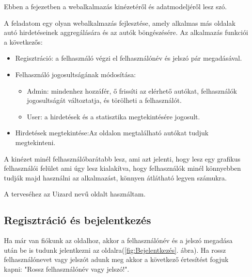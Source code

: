 Ebben a fejezetben a webalkalmazás kinézetéről és adatmodeljéről lesz szó.



A feladatom egy olyan webalkalmazás fejlesztése, amely alkalmas más oldalak autó hirdetéseinek aggregálására és az autók böngészésére. Az alkalmazás funkciói a következős:

\begin{itemize}
\item Regisztráció: a felhasználó végzi el felhasználónév és jelszó pár megadásával.
\item Felhasználó jogosultságának módosítása:
	\begin{itemize}
	\item Admin: mindenhez hozzáfér, ő frissíti az elérhető autókat, felhasználók jogosultságát változtatja, és törölheti a felhasználót.
	\item User: a hirdetések és a statisztika megtekintésére jogosult.
	\end{itemize}
\item Hirdetések megtekintése:Az oldalon megtalálható autókat tudjuk megtekinteni.
\end{itemize}


A kinézet minél felhasználóbarátabb lesz, ami azt jelenti, hogy lesz egy grafikus felhasználói felület ami úgy lesz kialakítva, hogy felhasználók minél könnyebben tudják majd használni az alkalmazást, könnyen átlátható legyen számukra.

A terveséhez az Uizard \cite{uizard} nevű oldalt használtam.

\subsection{Regisztráció és bejelentkezés}

Ha már van fiókunk az oldalhoz, akkor a felhasználónév és a jelszó megadása után be is tudunk jelentkezni az oldalra(\ref{fig:Bejelentkezés}. ábra). Ha rossz felhasználónevet vagy jelszót adunk meg akkor a következő értesítést fogjuk kapni: "Rossz felhasználónév vagy jelszó!".

\newpage

